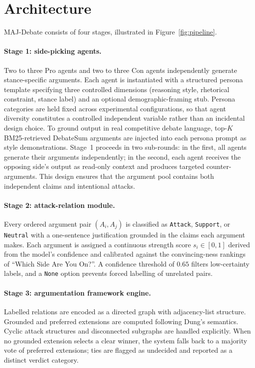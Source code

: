 \documentclass[11pt,twocolumn,letterpaper]{article}
\begin{document}
\section{Architecture}

MAJ-Debate consists of four stages, illustrated in
Figure~\ref{fig:pipeline}.

\paragraph{Stage 1: side-picking agents.}
Two to three Pro agents and two to three Con agents independently
generate stance-specific arguments. Each agent is instantiated with
a structured persona template specifying three controlled dimensions
(reasoning style, rhetorical constraint, stance label) and an
optional demographic-framing stub. Persona categories are held
fixed across experimental configurations, so that agent diversity
constitutes a controlled independent variable rather than an
incidental design choice. To ground output in real competitive
debate language, top-$K$ BM25-retrieved DebateSum arguments are
injected into each persona prompt as style demonstrations. Stage~1
proceeds in two sub-rounds: in the first, all agents generate their
arguments independently; in the second, each agent receives the
opposing side's output as read-only context and produces targeted
counter-arguments. This design ensures that the argument pool
contains both independent claims and intentional attacks.

\paragraph{Stage 2: attack-relation module.}
Every ordered argument pair $(A_i, A_j)$ is classified as
\texttt{Attack}, \texttt{Support}, or \texttt{Neutral} with a
one-sentence justification grounded in the claims each argument
makes. Each argument is assigned a continuous strength score
$s_i \in [0,1]$ derived from the model's confidence and calibrated
against the convincing-ness rankings of ``Which Side Are You On?''.
A confidence threshold of $0.65$ filters low-certainty labels, and
a \texttt{None} option prevents forced labelling of unrelated pairs.

\paragraph{Stage 3: argumentation framework engine.}
Labelled relations are encoded as a directed graph with
adjacency-list structure. Grounded and preferred extensions are
computed following Dung's semantics. Cyclic attack structures and
disconnected subgraphs are handled explicitly. When no grounded
extension selects a clear winner, the system falls back to a
majority vote of preferred extensions; ties are flagged as
undecided and reported as a distinct verdict category.
\end{document}

